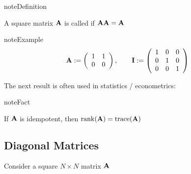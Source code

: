 \documentclass[letterpaper,10pt,english]{jupyterBook}
\begin{document}
\begin{sphinxadmonition}{note}{Definition}

\sphinxAtStartPar
A square matrix \({\bf A}\) is called  if \({\bf A} {\bf A} = {\bf A}\)
\end{sphinxadmonition}

\begin{sphinxadmonition}{note}{Example}
\begin{equation*}
\begin{split}
%
{\bf A} 
:= 
\left(
\begin{array}{cc}
1 & 1 \\
0 & 0 
\end{array}
\right),
\qquad
{\bf I} 
:= 
\left(
\begin{array}{ccc}
1 & 0 & 0 \\
0 & 1 & 0 \\ 
0 & 0 & 1 
\end{array}
\right)
%
\end{split}
\end{equation*}\end{sphinxadmonition}

\sphinxAtStartPar
The next result is often used in statistics / econometrics:

\begin{sphinxadmonition}{note}{Fact}

\sphinxAtStartPar
If \({\bf A}\) is idempotent, then \(\mathrm{rank}({\bf A}) = \mathrm{trace}({\bf A})\)
\end{sphinxadmonition}


\subsection{Diagonal Matrices}
\label{\detokenize{05.linear_algebra:diagonal-matrices}}
\sphinxAtStartPar
Consider a square \(N \times N\) matrix \({\bf A}\)
\end{document}
